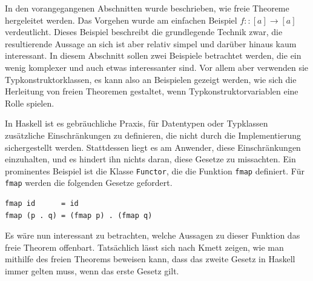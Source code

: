 In den vorangegangenen Abschnitten wurde beschrieben, wie freie Theoreme hergeleitet werden. Das Vorgehen wurde am einfachen
Beispiel $f :: [a] \rightarrow [a]$ verdeutlicht. Dieses Beispiel beschreibt die grundlegende Technik zwar, die resultierende
Aussage an sich ist aber relativ simpel und darüber hinaus kaum interessant.
In diesem Abschnitt sollen zwei Beispiele betrachtet werden, die ein wenig komplexer und auch etwas interessanter sind. Vor
allem aber verwenden sie Typkonstruktorklassen, es kann also an Beispielen gezeigt werden, wie sich die Herleitung
von freien Theoremen gestaltet, wenn Typkonstruktorvariablen eine Rolle spielen.


In Haskell ist es gebräuchliche Praxis, für Datentypen oder Typklassen zusätzliche Einschränkungen zu definieren, die nicht durch
die Implementierung sichergestellt werden. Stattdessen liegt es am Anwender, diese Einschränkungen einzuhalten, und es hindert
ihn nichts daran, diese Gesetze zu missachten. Ein prominentes Beispiel ist die Klasse \texttt{Functor}, die die Funktion
\texttt{fmap} definiert. Für \texttt{fmap} werden die folgenden Gesetze gefordert.



\begin{verbatim}
fmap id      = id
fmap (p . q) = (fmap p) . (fmap q)
\end{verbatim}


Es wäre nun interessant zu betrachten, welche Aussagen zu dieser Funktion das freie Theorem offenbart. Tatsächlich lässt sich
nach Kmett \cite{fmap} zeigen, wie man mithilfe des freien Theorems beweisen
kann, dass das zweite Gesetz in Haskell immer gelten muss, wenn das erste Gesetz gilt.

